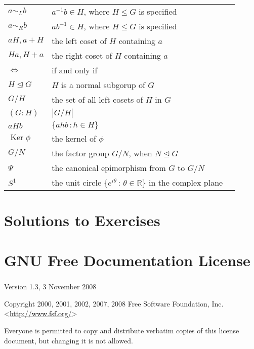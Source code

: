 \documentclass[10pt,]{book}
\theoremstyle{plain}
\theoremstyle{definition}
\theoremstyle{definition}
\theoremstyle{definition}
\theoremstyle{definition}
\numberwithin{equation}{section}
\def\R{\mathbb{R}}
\DeclareMathOperator{\Ker}{Ker}
\def\siml{\sim_L}
\def\simr{\sim_R}
\begin{document}
\begin{longtable}[l]{lp{}r}
\(a\siml b\)&\(a^{-1}b\in H\), where \(H\leq G\) is specified&\pageref{notation-66}\\
\(a\simr b\)&\(ab^{-1}\in H\), where \(H\leq G\) is specified&\pageref{notation-67}\\
\(aH, a+H\)&the left coset of \(H\) containing \(a\)&\pageref{notation-68}\\
\(Ha, H+a\)&the right coset of \(H\) containing \(a\)&\pageref{notation-69}\\
\(\Leftrightarrow\)&if and only if&\pageref{notation-70}\\
\(H\unlhd G\)&\(H\) is a normal subgorup of \(G\)&\pageref{notation-71}\\
\(G/H\)&the set of all left cosets of \(H\) in \(G\)&\pageref{notation-72}\\
\((G:H)\)&\(|G/H|\)&\pageref{notation-73}\\
\(aHb\)&\(\{ahb\,:h\in H\}\)&\pageref{notation-74}\\
\(\Ker \phi\)&the kernel of \(\phi\)&\pageref{notation-75}\\
\(G/N\)&the factor group \(G/N\), when \(N\unlhd G\)&\pageref{notation-76}\\
\(\Psi\)&the canonical epimorphism from \(G\) to \(G/N\)&\pageref{notation-77}\\
\(S^1\)&the unit circle  \(\{e^{i\theta} \,:\, \theta\in
\R\}\) in the complex plane&\pageref{notation-78}\\
\end{longtable}
\typeout{************************************************}
\typeout{************************************************}
\chapter[{Solutions to Exercises}]{Solutions to Exercises}\label{appendix-2}
\typeout{************************************************}
\typeout{************************************************}
\chapter[{GNU Free Documentation License}]{GNU Free Documentation License}\label{appendix-gfdl}
\typeout{************************************************}
\typeout{************************************************}
\paragraph[{}]{}\hypertarget{paragraphs-1}{}
Version 1.3, 3 November 2008%
\par
Copyright \textcopyright{} 2000, 2001, 2002, 2007, 2008 Free Software Foundation, Inc. \textless{}\url{http://www.fsf.org/}\textgreater{}%
\par
Everyone is permitted to copy and distribute verbatim copies of this license document, but changing it is not allowed.%
\typeout{************************************************}
\typeout{************************************************}
\end{document}
